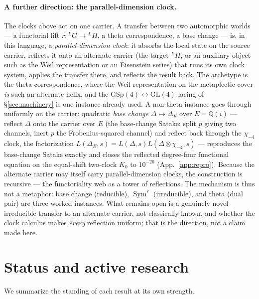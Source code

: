\documentclass[11pt]{article}
\theoremstyle{definition}
\newcommand{\Sym}{\operatorname{Sym}}
\begin{document}
\paragraph{A further direction: the parallel-dimension clock.} The clocks above act on one carrier. A
transfer between two automorphic worlds --- a functorial lift $r:{}^{L}G\to{}^{L}H$, a theta
correspondence, a base change --- is, in this language, a \emph{parallel-dimension clock}: it absorbs the
local state on the source carrier, reflects it onto an alternate carrier (the target ${}^{L}H$, or an
auxiliary object such as the Weil representation or an Eisenstein series) that runs its own clock system,
applies the transfer there, and reflects the result back. The archetype is the theta correspondence, where
the Weil representation on the metaplectic cover \emph{is} such an alternate helix, and the
$\mathrm{GSp}(4)\leftrightarrow\mathrm{GL}(4)$ lacing of \S\ref{sec:machinery} is one instance already
used. A non-theta instance goes through uniformly on the carrier: quadratic \emph{base change}
$\Delta\mapsto\Delta_E$ over $E=\mathbb Q(i)$ --- reflect $\Delta$ onto the carrier over $E$ (the
base-change Satake: split $p$ giving two channels, inert $p$ the Frobenius-squared channel) and reflect
back through the $\chi_{-4}$ clock, the factorization $L(\Delta_E,s)=L(\Delta,s)L(\Delta\otimes\chi_{-4},s)$
--- reproduces the base-change Satake exactly and closes the reflected degree-four functional equation on
the equal-shift two-clock $K_0$ to $10^{-26}$ (App.~\ref{app:repro}). Because the alternate carrier may
itself carry parallel-dimension clocks, the construction is recursive --- the functoriality web as a tower
of reflections. The mechanism is thus not a metaphor: base change (reducible), $\Sym^r$ (irreducible), and
theta (dual pair) are three worked instances. What remains open is a genuinely novel irreducible transfer
to an alternate carrier, not classically known, and whether the clock calculus makes \emph{every}
reflection uniform; that is the direction, not a claim made here.

\section{Status and active research}\label{sec:status}

We summarize the standing of each result at its own strength.
\end{document}
